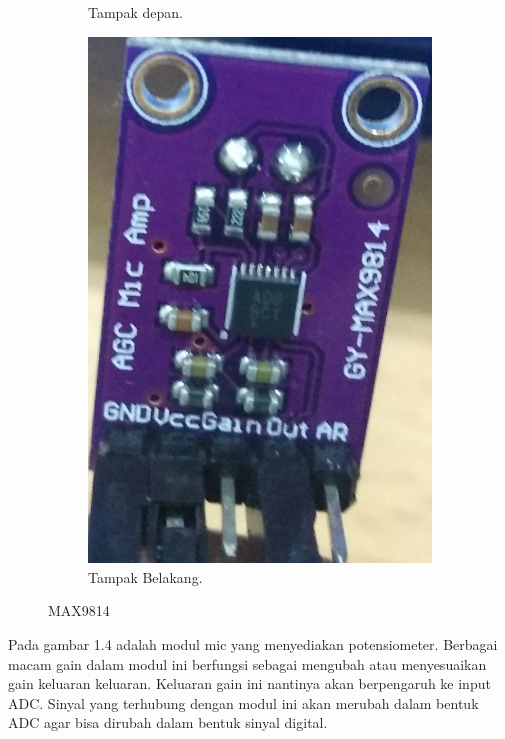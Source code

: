 \documentclass[11pt]{article}
\begin{document}
\begin{figure}[h!]
\begin{subfigure}[b]{0.39\linewidth}
		\caption{Tampak depan.}
	\end{subfigure}
	\begin{subfigure}[b]{0.4\linewidth}
		\includegraphics[width=\linewidth]{dokumentasi/MIC/2.jpg}
		\caption{Tampak Belakang.}
	\end{subfigure}
	\caption{MAX9814}
	\label{fig:MAX9814}
\end{figure}
Pada gambar 1.4 adalah modul mic yang menyediakan potensiometer.
Berbagai macam gain dalam modul ini berfungsi sebagai mengubah atau menyesuaikan gain keluaran keluaran.
Keluaran gain ini nantinya akan berpengaruh ke input ADC.
Sinyal yang terhubung dengan modul ini akan merubah dalam bentuk ADC agar bisa dirubah dalam bentuk sinyal digital.
\end{document}
